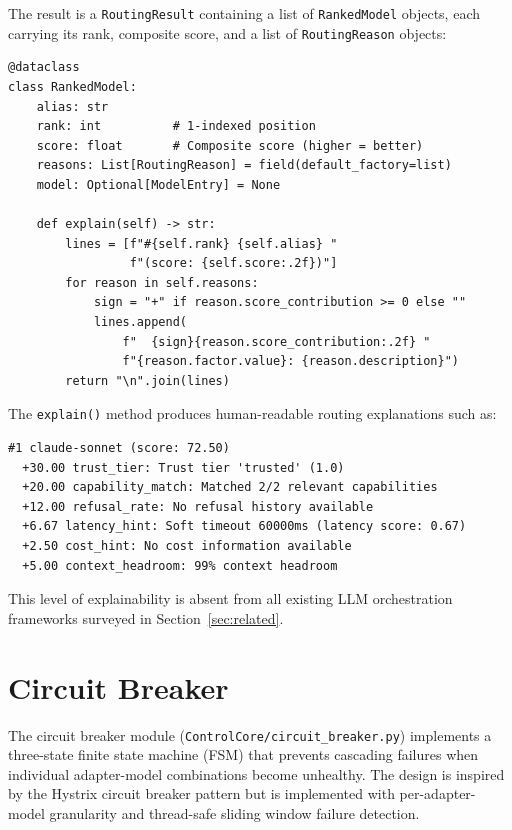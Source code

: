 \documentclass[11pt,a4paper]{article}
\theoremstyle{plain}
\theoremstyle{definition}
\begin{document}
The result is a \texttt{RoutingResult} containing a list of \texttt{RankedModel}
objects, each carrying its rank, composite score, and a list of
\texttt{RoutingReason} objects:

\begin{lstlisting}[style=pythonstyle, caption={RankedModel with explainability from \texttt{routing.py}}]
@dataclass
class RankedModel:
    alias: str
    rank: int          # 1-indexed position
    score: float       # Composite score (higher = better)
    reasons: List[RoutingReason] = field(default_factory=list)
    model: Optional[ModelEntry] = None

    def explain(self) -> str:
        lines = [f"#{self.rank} {self.alias} "
                 f"(score: {self.score:.2f})"]
        for reason in self.reasons:
            sign = "+" if reason.score_contribution >= 0 else ""
            lines.append(
                f"  {sign}{reason.score_contribution:.2f} "
                f"{reason.factor.value}: {reason.description}")
        return "\n".join(lines)
\end{lstlisting}

The \texttt{explain()} method produces human-readable routing explanations such
as:

\begin{verbatim}
#1 claude-sonnet (score: 72.50)
  +30.00 trust_tier: Trust tier 'trusted' (1.0)
  +20.00 capability_match: Matched 2/2 relevant capabilities
  +12.00 refusal_rate: No refusal history available
  +6.67 latency_hint: Soft timeout 60000ms (latency score: 0.67)
  +2.50 cost_hint: No cost information available
  +5.00 context_headroom: 99% context headroom
\end{verbatim}

This level of explainability is absent from all existing LLM orchestration
frameworks surveyed in Section~\ref{sec:related}.

\section{Circuit Breaker}
\label{sec:circuit}

The circuit breaker module (\texttt{ControlCore/circuit\_breaker.py}) implements
a three-state finite state machine (FSM) that prevents cascading failures when
individual adapter-model combinations become unhealthy. The design is inspired by
the Hystrix circuit breaker pattern but is implemented with per-adapter-model
granularity and thread-safe sliding window failure detection.
\end{document}
